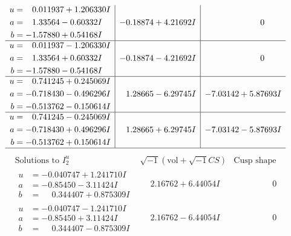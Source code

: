 \documentclass[1p]{elsarticle_modified}
\theoremstyle{definition}
\newcommand{\I}{\sqrt{-1}}
\begin{document}
$$\begin{array}{c|c|c}
\begin{aligned}
u &= \phantom{-}0.011937 + 1.206330 I \\
a &= \phantom{-}1.33564 - 0.60332 I \\
b &= -1.57880 + 0.54168 I\end{aligned}
 & -0.18874 + 4.21692 I & \phantom{-0.000000 } 0 \\ \hline\begin{aligned}
u &= \phantom{-}0.011937 - 1.206330 I \\
a &= \phantom{-}1.33564 + 0.60332 I \\
b &= -1.57880 - 0.54168 I\end{aligned}
 & -0.18874 - 4.21692 I & \phantom{-0.000000 } 0 \\ \hline\begin{aligned}
u &= \phantom{-}0.741245 + 0.245069 I \\
a &= -0.718430 - 0.496296 I \\
b &= -0.513762 - 0.150614 I\end{aligned}
 & \phantom{-}1.28665 - 6.29745 I & -7.03142 + 5.87693 I \\ \hline\begin{aligned}
u &= \phantom{-}0.741245 - 0.245069 I \\
a &= -0.718430 + 0.496296 I \\
b &= -0.513762 + 0.150614 I\end{aligned}
 & \phantom{-}1.28665 + 6.29745 I & -7.03142 - 5.87693 I\\
 \hline 
 \end{array}$$\newpage$$\begin{array}{c|c|c}  
\text{Solutions to }I^u_{2}& \I (\text{vol} + \sqrt{-1}CS) & \text{Cusp shape}\\
 \hline 
\begin{aligned}
u &= -0.040747 + 1.241710 I \\
a &= -0.85450 - 3.11424 I \\
b &= \phantom{-}0.344407 + 0.875309 I\end{aligned}
 & \phantom{-}2.16762 + 6.44054 I & \phantom{-0.000000 } 0 \\ \hline\begin{aligned}
u &= -0.040747 - 1.241710 I \\
a &= -0.85450 + 3.11424 I \\
b &= \phantom{-}0.344407 - 0.875309 I\end{aligned}
 & \phantom{-}2.16762 - 6.44054 I & \phantom{-0.000000 } 0 \\ \hline\begin{aligned}

\end{aligned}
\end{array}$$
\end{document}
